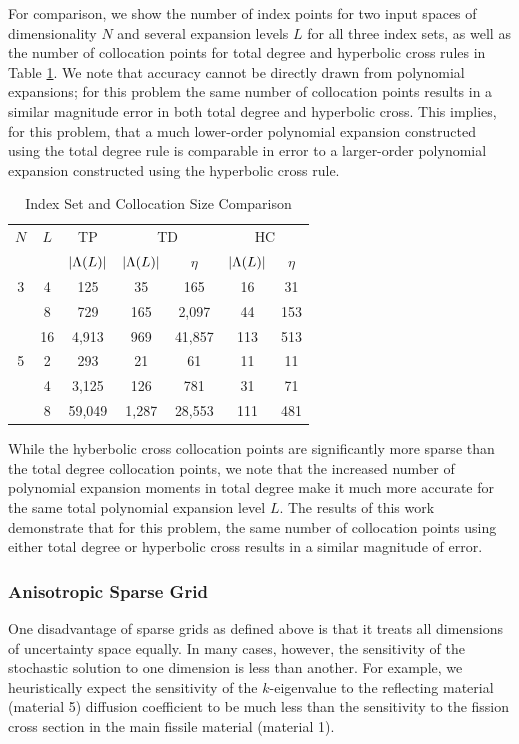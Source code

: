 \documentclass[11pt]{article}
\begin{document}
For comparison, we show the number of index points for two input spaces of dimensionality $N$ and several expansion levels $L$ for all three index sets, as well as the number of collocation points for total degree and hyperbolic cross rules in Table \ref{compIS}.  We note that accuracy cannot be directly drawn from polynomial expansions; for this problem the same number of collocation points results in a similar magnitude error in both total degree and hyperbolic cross.  This implies, for this problem, that a much lower-order polynomial expansion constructed using the total degree rule is comparable in error to a larger-order polynomial expansion constructed using the hyperbolic cross rule.
\begin{table}[H]
\centering
\begin{tabular}{c|c|c|c c|c c}
$N$ & $L$ & TP & \multicolumn{2}{|c|}{TD} & \multicolumn{2}{|c}{HC} \\ 
 &  & $\qty|\Lambda(L)|$ & $\qty|\Lambda(L)|$ & $\eta$ & $\qty|\Lambda(L)|$ & $\eta$\\ \hline
3 & 4 & 125    & 35    & 165   & 16 & 31\\
 & 8   & 729    & 165  & 2,097  & 44 & 153\\
 & 16 & 4,913  & 969   & 41,857 & 113 & 513\\ \hline
5 & 2 & 293 & 21 & 61 & 11 & 11\\
 & 4 & 3,125 & 126 & 781 & 31 & 71\\
 & 8 & 59,049 & 1,287 & 28,553 & 111 & 481 
\end{tabular}
\caption{Index Set and Collocation Size Comparison}
\label{compIS}
\end{table}
While the hyberbolic cross collocation points are significantly more sparse than the total degree collocation points, we note that the increased number of polynomial expansion moments in total degree make it much more accurate for the same total polynomial expansion level $L$.  The results of this work demonstrate that for this problem, the same number of collocation points using either total degree or hyperbolic cross results in a similar magnitude of error.

\subsubsection{Anisotropic Sparse Grid}
One disadvantage of sparse grids as defined above is that it treats all dimensions of uncertainty space equally.  In many cases, however, the sensitivity of the stochastic solution to one dimension is less than another.  For example, we heuristically expect the sensitivity of the $k$-eigenvalue to the reflecting material (material 5) diffusion coefficient to be much less than the sensitivity to the fission cross section in the main fissile material (material 1).  \\
\end{document}

